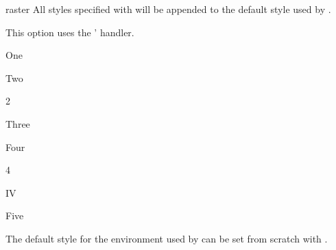 \documentclass[a4paper, 11pt]{article}
\begin{document}
\begin{optiondef}{raster}{}{}
    All styles specified with  will be appended to the default style used by .

    This option uses the '  handler.

    \begin{example}{}
        \begin{PLTBoxRaster}[raster = {raster equal height = none, raster valign = bottom, raster columns = 2}]
            \item One
            \item Two\par 2
            \item Three
            \item Four\par 4\par IV
            \item Five
        \end{PLTBoxRaster}
    \end{example}
\end{optiondef}

The default style for the environment  used by  can be set from scratch with .
\end{document}
